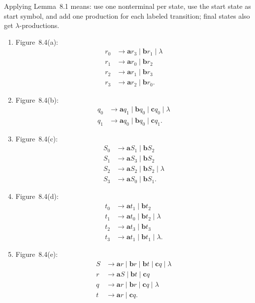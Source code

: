 \begin{enumerate}[{8.}1. ]
Applying Lemma~8.1 means: use one nonterminal per state, use the start state as
start symbol, and add one production for each labeled transition; final states
also get $\lambda$-productions.

\begin{enumerate}
\item Figure~8.4(a):
\[
\begin{aligned}
r_0&\to \pmb{a}r_3\mid \pmb{b}r_1\mid \lambda\\
r_1&\to \pmb{a}r_0\mid \pmb{b}r_2\\
r_2&\to \pmb{a}r_1\mid \pmb{b}r_3\\
r_3&\to \pmb{a}r_2\mid \pmb{b}r_0.
\end{aligned}
\]

\item Figure~8.4(b):
\[
\begin{aligned}
q_0&\to \pmb{a}q_1\mid \pmb{b}q_0\mid \pmb{c}q_0\mid \lambda\\
q_1&\to \pmb{a}q_0\mid \pmb{b}q_0\mid \pmb{c}q_1.
\end{aligned}
\]

\item Figure~8.4(c):
\[
\begin{aligned}
S_0&\to \pmb{a}S_1\mid \pmb{b}S_2\\
S_1&\to \pmb{a}S_3\mid \pmb{b}S_2\\
S_2&\to \pmb{a}S_2\mid \pmb{b}S_2\mid \lambda\\
S_3&\to \pmb{a}S_0\mid \pmb{b}S_1.
\end{aligned}
\]

\item Figure~8.4(d):
\[
\begin{aligned}
t_0&\to \pmb{a}t_1\mid \pmb{b}t_2\\
t_1&\to \pmb{a}t_0\mid \pmb{b}t_2\mid \lambda\\
t_2&\to \pmb{a}t_3\mid \pmb{b}t_3\\
t_3&\to \pmb{a}t_1\mid \pmb{b}t_1\mid \lambda.
\end{aligned}
\]

\item Figure~8.4(e):
\[
\begin{aligned}
S&\to \pmb{a}r\mid \pmb{b}r\mid \pmb{b}t\mid \pmb{c}q\mid \lambda\\
r&\to \pmb{a}S\mid \pmb{b}t\mid \pmb{c}q\\
q&\to \pmb{a}r\mid \pmb{b}r\mid \pmb{c}q\mid \lambda\\
t&\to \pmb{a}r\mid \pmb{c}q.
\end{aligned}
\]
\end{enumerate}


\end{enumerate}
